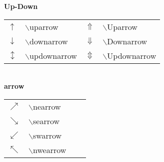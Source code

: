 			\textbf{Up-Down}\\
			\begin{tabular}{ p{} p{} 
							p{} p{}  }
			\toprule
			$\uparrow $			&$\backslash$uparrow& 
			$\Uparrow$				&$\backslash$Uparrow \\
			$\downarrow$			&$\backslash$downarrow&
			$\Downarrow$			&$\backslash$Downarrow\\
			$\updownarrow$		&$\backslash$updownarrow&
			$\Updownarrow$		&$\backslash$Updownarrow\\
			\bottomrule
			\end{tabular} \\

			\textbf{arrow}\\
			\begin{tabular}{ p{} p{} 
							p{} p{}  }
			\toprule
			$\nearrow $				&$\backslash$nearrow \\
			$\searrow $				&$\backslash$searrow \\ 
			$\swarrow $			&$\backslash$swarrow \\ 
			$\nwarrow $			&$\backslash$nwearrow \\ 
			\bottomrule
			\end{tabular} \\






































